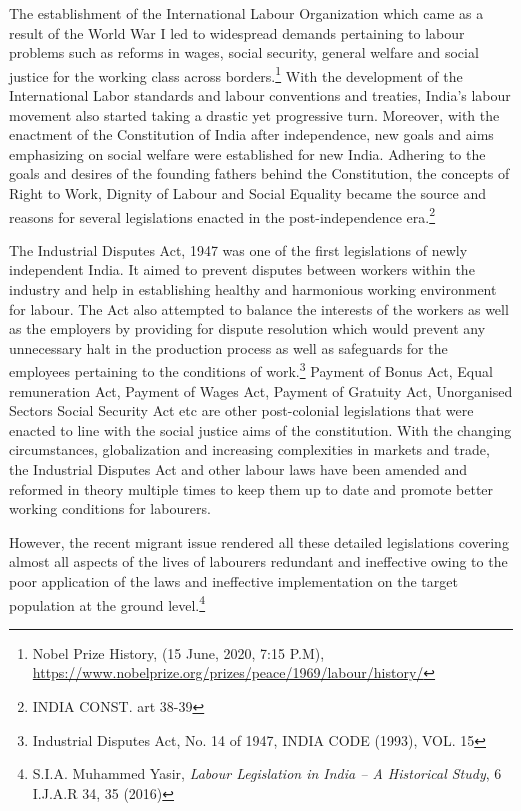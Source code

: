 \begin{multicols}{2}
\noi
The establishment of the International Labour Organization which came as a result of the
World War I led to widespread demands pertaining to labour problems such as reforms in
wages, social security, general welfare and social justice for the working class across
borders.\footnote{Nobel Prize History, (15 June, 2020, 7:15 P.M), \url{https://www.nobelprize.org/prizes/peace/1969/labour/history/}}
 With the development of the International Labor standards and labour conventions
and treaties, India’s labour movement also started taking a drastic yet progressive turn.
Moreover, with the enactment of the Constitution of India after independence, new goals and
aims emphasizing on social welfare were established for new India. Adhering to the goals
and desires of the founding fathers behind the Constitution, the concepts of Right to Work,
Dignity of Labour and Social Equality became the source and reasons for several legislations
enacted in the post-independence era.\footnote{INDIA CONST. art 38-39 }

\noi
The Industrial Disputes Act, 1947 was one of the first legislations of newly independent
India. It aimed to prevent disputes between workers within the industry and help in
establishing healthy and harmonious working environment for labour. The Act also attempted
to balance the interests of the workers as well as the employers by providing for dispute
resolution which would prevent any unnecessary halt in the production process as well as
safeguards for the employees pertaining to the conditions of work.\footnote{Industrial Disputes Act, No. 14 of 1947, INDIA CODE (1993), VOL. 15 }
 Payment of Bonus Act,
Equal remuneration Act, Payment of Wages Act, Payment of Gratuity Act, Unorganised
Sectors Social Security Act etc are other post-colonial legislations that were enacted to line
with the social justice aims of the constitution. With the changing circumstances,
globalization and increasing complexities in markets and trade, the Industrial Disputes Act
and other labour laws have been amended and reformed in theory multiple times to keep
them up to date and promote better working conditions for labourers. 

\noi
However, the recent migrant issue rendered all these detailed legislations covering almost all
aspects of the lives of labourers redundant and ineffective owing to the poor application of
the laws and ineffective implementation on the target population at the ground level.\footnote{S.I.A. Muhammed Yasir, \textit{Labour Legislation in India – A Historical Study}, 6 I.J.A.R 34, 35 (2016)}


\end{multicols}
